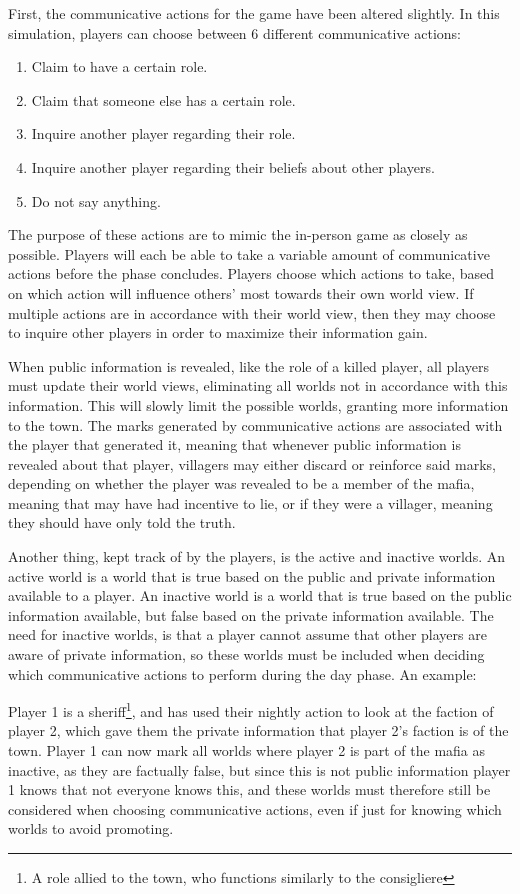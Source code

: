 First, the communicative actions for the game have been altered slightly. In
this simulation, players can choose between 6 different communicative actions:
\begin{enumerate}
	\itemsep0px
	\item \label{Com}Claim to have a certain role.
	\item Claim that someone else has a certain role.
	\item Inquire another player regarding their role.
	\item Inquire another player regarding their beliefs about other players.
	\item Do not say anything.
\end{enumerate}
The purpose of these actions are to mimic the in-person game as closely as
possible. Players will each be able to take a variable amount of communicative actions before the
phase concludes. Players choose which actions to take, based on which action
will influence others’ most towards their own world view. If multiple actions
are in accordance with their world view, then they may choose to inquire other
players in order to maximize their information gain.

When public information is revealed, like the role of a killed player, all
players must update their world views, eliminating all worlds not in accordance
with this information. This will slowly limit the possible worlds, granting
more information to the town. The marks generated by communicative actions are
associated with the player that generated it, meaning that whenever public
information is revealed about that player, villagers may either discard or
reinforce said marks, depending on whether the player was revealed to be a
member of the mafia, meaning that may have had incentive to lie, or if they
were a villager, meaning they should have only told the truth.

Another thing, kept track of by the players, is the active and inactive worlds.
An active world is a world that is true based on the public and private
information available to a player. An inactive world is a world that is true
based on the public information available, but false based on the private
information available. The need for inactive worlds, is that a player cannot
assume that other players are aware of private information, so these worlds
must be included when deciding which communicative actions to perform during
the day phase. An example:

Player 1 is a sheriff\footnote{A role allied to the town, who functions
	similarly to the consigliere}, and has used their nightly action to look at the
faction of player 2, which gave them the private information that player 2's
faction is of the town. Player 1 can now mark all worlds where player 2 is part
of the mafia as inactive, as they are factually false, but since this is not
public information player 1 knows that not everyone knows this, and these
worlds must therefore still be considered when choosing communicative actions,
even if just for knowing which worlds to avoid promoting.
